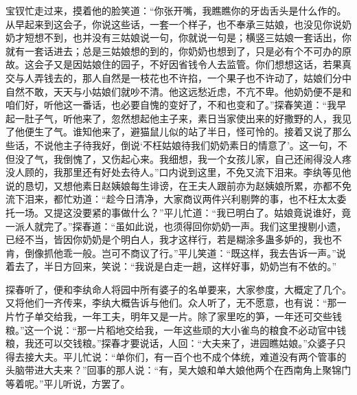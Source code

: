 宝钗忙走过来，摸着他的脸笑道：``你张开嘴，我瞧瞧你的牙齿舌头是什么作的。从早起来到这会子，你说这些话，一套一个样子，也不奉承三姑娘，也没见你说奶奶才短想不到，也并没有三姑娘说一句，你就说一句是；横竖三姑娘一套话出，你就有一套话进去；总是三姑娘想的到的，你奶奶也想到了，只是必有个不可办的原故。这会子又是因姑娘住的园子，不好因省钱令人去监管。你们想想这话，若果真交与人弄钱去的，那人自然是一枝花也不许掐，一个果子也不许动了，姑娘们分中自然不敢，天天与小姑娘们就吵不清。他这远愁近虑，不亢不卑。他奶奶便不是和咱们好，听他这一番话，也必要自愧的变好了，不和也变和了。''探春笑道：``我早起一肚子气，听他来了，忽然想起他主子来，素日当家使出来的好撒野的人，我见了他便生了气。谁知他来了，避猫鼠儿似的站了半日，怪可怜的。接着又说了那么些话，不说他主子待我好，倒说`不枉姑娘待我们奶奶素日的情意了'。这一句，不但没了气，我倒愧了，又伤起心来。我细想，我一个女孩儿家，自己还闹得没人疼没人顾的，我那里还有好处去待人。''口内说到这里，不免又流下泪来。李纨等见他说的恳切，又想他素日赵姨娘每生诽谤，在王夫人跟前亦为赵姨娘所累，亦都不免流下泪来，都忙劝道：``趁今日清净，大家商议两件兴利剔弊的事，也不枉太太委托一场。又提这没要紧的事做什么？''平儿忙道：``我已明白了。姑娘竟说谁好，竟一派人就完了。''探春道：``虽如此说，也须得回你奶奶一声。我们这里搜剔小遗，已经不当，皆因你奶奶是个明白人，我才这样行，若是糊涂多蛊多妒的，我也不肯，倒像抓他乖一般。岂可不商议了行。''平儿笑道：``既这样，我去告诉一声。''说着去了，半日方回来，笑说：``我说是白走一趟，这样好事，奶奶岂有不依的。''

探春听了，便和李纨命人将园中所有婆子的名单要来，大家参度，大概定了几个。又将他们一齐传来，李纨大概告诉与他们。众人听了，无不愿意，也有说：``那一片竹子单交给我，一年工夫，明年又是一片。除了家里吃的笋，一年还可交些钱粮。''这一个说：``那一片稻地交给我，一年这些顽的大小雀鸟的粮食不必动官中钱粮，我还可以交钱粮。''探春才要说话，人回：``大夫来了，进园瞧姑娘。''众婆子只得去接大夫。平儿忙说：``单你们，有一百个也不成个体统，难道没有两个管事的头脑带进大夫来？''回事的那人说：``有，吴大娘和单大娘他两个在西南角上聚锦门等着呢。''平儿听说，方罢了。

